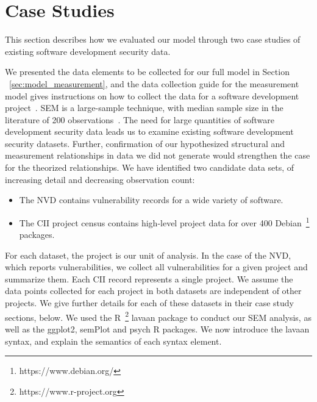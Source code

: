 \section{Case Studies}
\label{sec:evaluation}
This section describes how we evaluated our model through two case studies of existing software development security data.

We presented the data elements to be collected for our full model in Section ~\ref{sec:model_measurement}, and the data collection guide for the measurement model gives instructions on how to collect the data for a software development project~\cite{morrison2016spefsite}. SEM is a large-sample technique, with median sample size in the literature of 200 observations~\cite{kline2015principles}. The need for large quantities of software development security data leads us to examine existing software development security datasets. Further, confirmation of our hypothesized structural and measurement relationships in data we did not generate would strengthen the case for the theorized relationships.
We have identified two candidate data sets, of increasing detail and decreasing observation count: 
\begin{itemize}
\item The NVD contains vulnerability records for a wide variety of software.
\item The CII project census contains high-level project data for over 400 Debian~\footnote{https://www.debian.org/} packages.
\end{itemize}

For each dataset, the project is our unit of analysis. In the case of the NVD, which reports vulnerabilities, we collect all vulnerabilities for a given project and summarize them. Each CII record represents a single project. We assume the data points collected for each project in both datasets are independent of other projects.  We give further details for each of these datasets in their case study sections, below. We used the R~\footnote{https://www.r-project.org} lavaan package to conduct our SEM analysis, as well as the ggplot2, semPlot and psych R packages. We now introduce the lavaan syntax, and explain the semantics of each syntax element.

